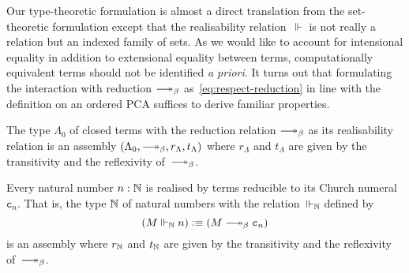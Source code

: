 \documentclass[a4paper,UKenglish,numberwithinsect,cleveref,thm-restate]{lipics-v2021}
\numberwithin{equation}{section}
\theoremstyle{definition}
\theoremstyle{plain}
\begin{document}
Our type-theoretic formulation is almost a direct translation from the set-theoretic formulation except that the realisability relation~$\Vdash$ is not really a relation but an indexed family of sets.
As we would like to account for intensional equality in addition to extensional equality between terms,
computationally equivalent terms should not be identified \emph{a priori}.
It turns out that formulating the interaction with reduction $\reduce$ as~\eqref{eq:respect-reduction} in line with the definition on an ordered PCA suffices to derive familiar properties.

\begin{example}\label{ex:assembly-lambda}
  The type $\Lambda_0$ of closed terms with the reduction relation ${\reduce}$ as its realisability relation is an assembly $(\Lambda_0, \reduce, r_\Lambda, t_\Lambda)$ where $r_\Lambda$ and $t_\Lambda$ are given by the transitivity and the reflexivity of~$\reduce$.
\end{example}

\begin{example} \label{ex:assembly-naturals}
  Every natural number $n : \mathbb{N}$ is realised by terms reducible to its Church numeral~$\mathtt{c}_n$.
  That is, the type $\mathbb{N}$ of natural numbers with the relation~$\Vdash_{\mathbb{N}}$ defined by
  \[
    \left(M \Vdash_\Nat n\right) \defeq \left(M \reduce \mathtt{c}_n\right)
  \]
  is an assembly where $r_\mathbb{N}$ and $t_\mathbb{N}$ are given by the transitivity and the reflexivity of~$\reduce$.
\end{example}
\end{document}
